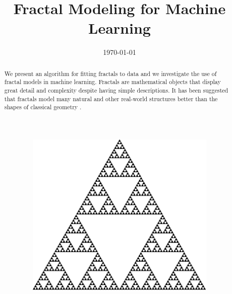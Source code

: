 \documentclass[10pt,a4paper,oneside]{article}
\title{Fractal Modeling for Machine Learning}
\date{\today}
\theoremstyle{definition}
\begin{document}
\maketitle

\begin{abstract}
\noindent We present an algorithm for fitting fractals to data and we investigate the use of fractal models in machine learning. Fractals are mathematical objects that display great detail and complexity despite having simple descriptions. It has been suggested that fractals model many natural and other real-world structures better than the shapes of classical geometry \cite{mandelbrot1982fractal}.
\end{abstract}

\begin{figure}[b]
  \centering
  \begin{subfigure}[b]{0.3\textwidth}
    \includegraphics[width=\textwidth]{../img/sierpinski.pdf}
    \caption{}
    \label{fig:sierpinski}
  \end{subfigure}  
  \hspace{0.03\textwidth}
  \begin{subfigure}[b]{0.3\textwidth}

\end{subfigure}
\end{figure}
\end{document}

